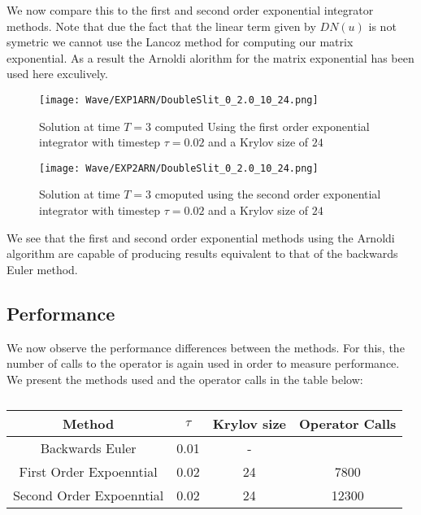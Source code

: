 We now compare this to the first and second order exponential integrator methods.
Note that due the fact that the linear term given by $DN(u)$ is not symetric we cannot use the Lancoz method for computing our matrix exponential.
As a result the Arnoldi alorithm for the matrix exponential has been used here exculively.
\begin{figure}[H]
    \centering
    \begin{minipage}{0.49\textwidth}
        \texttt{[image: Wave/EXP1ARN/DoubleSlit\_0\_2.0\_10\_24.png]} %
        \caption{Solution at time $T=3$ computed Using the first order exponential integrator with timestep $\tau = 0.02$ and a Krylov size of $24$}
        \label{fig:second order 16}
    \end{minipage}\hfill
    \centering
    \begin{minipage}{0.49\textwidth}
        \texttt{[image: Wave/EXP2ARN/DoubleSlit\_0\_2.0\_10\_24.png]} %
        \caption{Solution at time $T=3$ cmoputed using the second order exponential integrator with timestep $\tau = 0.02$ and a Krylov size of $24$}
        \label{fig:second order 32}
    \end{minipage}\hfill
\end{figure}

We see that the first and second order exponential methods using the Arnoldi algorithm are capable of producing results equivalent to that of the backwards Euler method.

\subsection{Performance}
We now observe the performance differences between the methods.
For this, the number of calls to the operator is again used in order to measure performance.
We present the methods used and the operator calls in the table below:

\begin{table}[H]
    \centering
    \begin{tabular}{| c | c | c | c |}
    \hline
    Method & $\tau$ & Krylov size & Operator Calls\\
    \hline
    Backwards Euler & 0.01 & - &  \\
    First Order Expoenntial & 0.02 & 24 & 7800 \\
    Second Order Expoenntial & 0.02 & 24 & 12300 \\
    \hline
    \end{tabular}
    \caption{}
    \label{tab:reduced_data}
\end{table}
